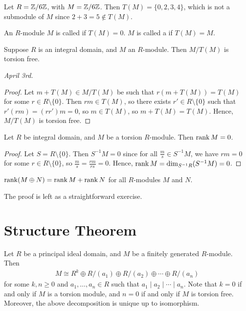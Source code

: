 \begin{example}
    Let $R = \mathbb{Z}/6\mathbb{Z}$, with $M = \mathbb{Z}/6\mathbb{Z}$. Then $T(M) = \{0,2,3,4\}$, which is not a submodule of $M$ since $2 + 3 = 5 \notin T(M)$.
\end{example}

\begin{definition}
    An $R$-module $M$ is called  if $T(M) = 0$. $M$ is called a  if $T(M) = M$.
\end{definition}

\begin{proposition}
    Suppose $R$ is an integral domain, and $M$ an $R$-module. Then $M/T(M)$ is torsion free. 
\end{proposition}


\textit{April 3rd.}

\begin{proof}
    Let $m + T(M) \in M/T(M)$ be such that $r(m + T(M)) = T(M)$ for some $r \in R \setminus \{0\}$. Then $rm \in T(M)$, so there exists $r' \in R \setminus \{0\}$ such that $r'(rm) = (rr')m = 0$, so $m \in T(M)$, so $m + T(M) = T(M)$. Hence, $M/T(M)$ is torsion free.
\end{proof}

\begin{proposition}
    Let $R$ be integral domain, and $M$ be a torsion $R$-module. Then $\operatorname{rank} M = 0$.
\end{proposition}

\begin{proof}
    Let $S = R \setminus \{0\}$. Then $S^{-1}M = 0$ since for all $\frac{m}{s} \in S^{-1}M$, we have $rm = 0$ for some $r \in R \setminus \{0\}$, so $\frac{m}{s} = \frac{rm}{rs} = 0$. Hence, $\operatorname{rank} M = \dim_{S^{-1}R}(S^{-1}M) = 0$.
\end{proof}

\begin{proposition}
    $\operatorname{rank}(M\oplus N) = \operatorname{rank} M + \operatorname{rank} N$ for all $R$-modules $M$ and $N$.
\end{proposition}
The proof is left as a straightforward exercise.

\section{Structure Theorem}

\begin{theorem}
    Let $R$ be a principal ideal domain, and $M$ be a finitely generated $R$-module. Then
    \begin{align}
        M \cong R^{k} \oplus R/(a_{1}) \oplus R/(a_{2}) \oplus \cdots \oplus R/(a_{n})
    \end{align}
    for some $k,n \geq 0$ and $a_{1},\ldots,a_{n} \in R$ such that $a_{1} \mid a_{2} \mid \cdots \mid a_{n}$. Note that $k = 0$ if and only if $M$ is a torsion module, and $n = 0$ if and only if $M$ is torsion free. Moreover, the above decomposition is unique up to isomorphism.
\end{theorem}

